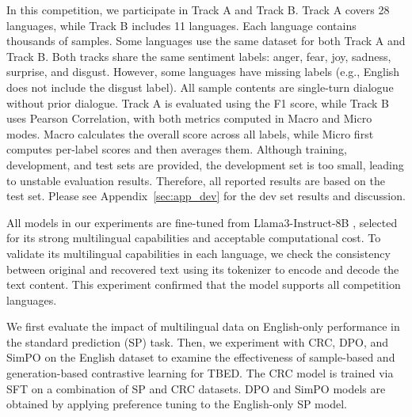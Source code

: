 \documentclass[11pt]{article}
\begin{document}
In this competition, we participate in Track A and Track B. Track A covers 28 languages, while Track B includes 11 languages. Each language contains thousands of samples. Some languages use the same dataset for both Track A and Track B. Both tracks share the same sentiment labels: anger, fear, joy, sadness, surprise, and disgust. However, some languages have missing labels (e.g., English does not include the disgust label). All sample contents are single-turn dialogue without prior dialogue. Track A is evaluated using the F1 score, while Track B uses Pearson Correlation, with both metrics computed in Macro and Micro modes. Macro calculates the overall score across all labels, while Micro first computes per-label scores and then averages them. Although training, development, and test sets are provided, the development set is too small, leading to unstable evaluation results. Therefore, all reported results are based on the test set. Please see Appendix~\ref{sec:app_dev} for the dev set results and discussion.


All models in our experiments are fine-tuned from Llama3-Instruct-8B  \cite{dubey2024llama}, selected for its strong multilingual capabilities and acceptable computational cost. To validate its multilingual capabilities in each language, we check the consistency between original and recovered text using its tokenizer to encode and decode the text content. This experiment confirmed that the model supports all competition languages.


We first evaluate the impact of multilingual data on English-only performance in the standard prediction (SP) task. Then, we experiment with CRC, DPO, and SimPO on the English dataset to examine the effectiveness of sample-based and generation-based contrastive learning for TBED. The CRC model is trained via SFT on a combination of SP and CRC datasets. DPO and SimPO models are obtained by applying preference tuning to the English-only SP model.
\end{document}
